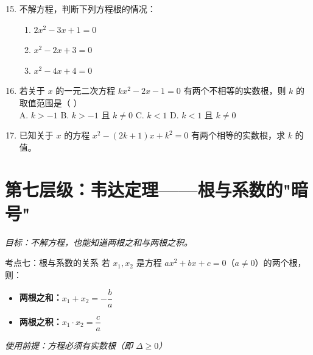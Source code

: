 \documentclass[12pt, a4paper]{article}
\begin{document}
\begin{examplebox}
    \begin{enumerate}[label=\textbf{例\arabic*.}]
        \setcounter{enumi}{14}
        \item 不解方程，判断下列方程根的情况：
        \begin{enumerate}
            \item[(1)] $2x^2 - 3x + 1 = 0$
            \item[(2)] $x^2 - 2x + 3 = 0$
            \item[(3)] $x^2 - 4x + 4 = 0$
        \end{enumerate}
        
        \item 若关于 $x$ 的一元二次方程 $kx^2 - 2x - 1 = 0$ 有两个不相等的实数根，则 $k$ 的取值范围是（ \quad ）\\
        A. $k > -1$ \quad B. $k > -1$ 且 $k \neq 0$ \quad C. $k < 1$ \quad D. $k < 1$ 且 $k \neq 0$
        
        \item 已知关于 $x$ 的方程 $x^2 - (2k+1)x + k^2 = 0$ 有两个相等的实数根，求 $k$ 的值。
    \end{enumerate}
\end{examplebox}

\begin{answerblank}[第15-17题]
    \vspace{7cm}
\end{answerblank}

\newpage

\section{第七层级：韦达定理——根与系数的"暗号"}
\textit{目标：不解方程，也能知道两根之和与两根之积。}

\begin{conceptbox}{考点七：根与系数的关系}
    若 $x_1, x_2$ 是方程 $ax^2 + bx + c = 0$（$a \neq 0$）的两个根，则：
    \begin{itemize}
        \item \textbf{两根之和：}$x_1 + x_2 = -\dfrac{b}{a}$
        \item \textbf{两根之积：}$x_1 \cdot x_2 = \dfrac{c}{a}$
    \end{itemize}
    \textit{使用前提：方程必须有实数根（即 $\Delta \geq 0$）}
\end{conceptbox}
\end{document}

